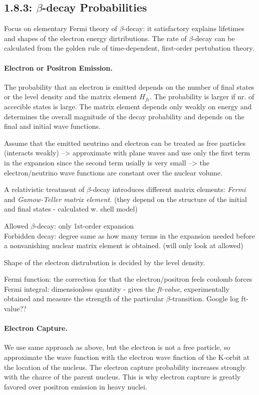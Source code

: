 \documentclass[a4paper,12pt]{article}
\begin{document}
\subsection*{1.8.3: $\beta$-decay Probabilities}
Focus on elementary Fermi theory of $\beta$-decay: it satisfactory explains lifetimes and shapes of the electron energy dirtributions. The rate of $\beta$-decay can be calculated from the golden rule of time-dependent, first-order pertubation theory. 

\paragraph{Electron or Positron Emission.}
The probability that an electron is emitted depends on the number of final states or the level density and the matrix element $H_{fi}$. The probability is larger if nr. of accecible states is large. The matrix element depends only weakly on energy and determines the overall magnitude of the decay probability and depends on the final and initial wave functions. 

Assume that the emitted neutrino and electron can be treated as free particles (interacts weakly) --> approximate with plane waves and use only the first term in the expansion since the second term usially is very small --> the electron/neutrino wave functions are constant over the nuclear volume. 

A relativistic treatment of $\beta$-decay introduces different matrix elements: \textit{Fermi} and \textit{Gamow-Teller matrix element.} (they depend on the structure of the initial and final states - calculated w. shell model)

Allowed $\beta$-decay: only 1st-order expansion \\
Forbidden decay: degree same as how many terms in the expansion needed before a nonvanishing nuclear matrix element is obtained. (will only look at allowed)

Shape of the electron distrubution is decided by the level density.

Fermi function: the correction for that the electron/positron feels coulomb forces \\
Fermi integral: dimensionless quantity - gives the \textit{ft-value}, experimentally obtained and measure the strength of the particular $\beta$-transition. Google log ft-value??

\paragraph{Electron Capture.}
We use same approach as above, but the electron is not a free particle, so approximate the wave function with the electron wave finction of the K-orbit at the location of the nucleus. The electron capture probability increases strongly with the charce of the parent nucleus. This is why electron capture is greatly favored over positron emission in heavy nuclei. 
\end{document}
